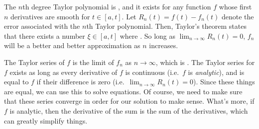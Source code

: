 \documentclass[12pt]{book}
\begin{document}
The $n$th degree Taylor polynomial is
\be
{},
\ee
and it exists for any function $f$ whose first $n$ derivatives are smooth for
$t\in [a,t]$. 
Let $R_n(t) = f(t) -f_n(t)$ denote the error associated with the $n$th Taylor 
polynomial. Then, Taylor's theorem states that there exists a number 
$\xi \in [a,t]$ where
\be
{}.
\ee
So long as $\lim_{n\rightarrow \infty} R_n(t) =0$, $f_n$ will be a better and
better approximation as $n$ increases.


The Taylor series of $f$ is the limit of $f_n$ as $n\rightarrow\infty$, which is
\be
{}.
\ee
The Taylor series for $f$ exists as long as every derivative of $f$ is
continuous (i.e.\ $f$ is \emph{analytic}), and is equal to $f$ if their 
difference is zero (i.e.\ $\lim_{n\rightarrow \infty} R_n(t) =0$). Since these 
things are equal, we can use this to solve equations. Of course, we need to 
make sure that these series converge in order for our solution to make sense.
What's more, if $f$ is analytic, then the derivative of the sum is the sum
of the derivatives, which can greatly simplify things.\\
\end{document}
